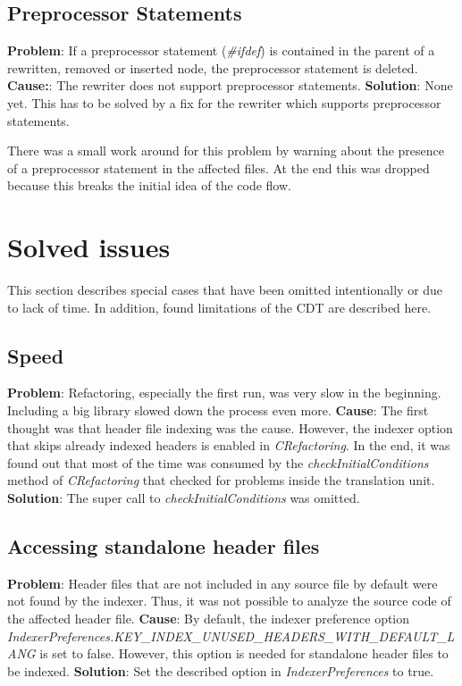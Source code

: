 \subsection{Preprocessor Statements}
\textbf{Problem}: If a preprocessor statement (\textit{\#ifdef}) is contained in
the parent of a rewritten, removed or inserted node, the preprocessor statement
is deleted.
\textbf{Cause:}: The rewriter does not support preprocessor statements.
\textbf{Solution}: None yet. This has to be solved by a fix for the rewriter
which supports preprocessor statements.

There was a small work around for this problem by warning about the presence of
a preprocessor statement in the affected files. At the end this was dropped
because this breaks the initial idea of the code flow.

\section{Solved issues}

This section describes special cases that have been omitted intentionally or due 
to lack of time. In addition, found limitations of the CDT are described here.

\subsection{Speed}
\textbf{Problem}: Refactoring, especially the first run, was very slow in the 
beginning. Including a big library slowed down the process even more.
\textbf{Cause}: The first thought was that header file indexing was the cause. 
However, the indexer option that skips already indexed headers is enabled in 
\textit{CRefactoring}. In the end, it was found out that most of the time was 
consumed by the \textit{checkInitialConditions} method of \textit{CRefactoring} 
that checked for problems inside the translation unit.
\textbf{Solution}: The super call to \textit{checkInitialConditions} was omitted.

\subsection{Accessing standalone header files}
\textbf{Problem}: Header files that are not included in any source file by 
default were not found by the indexer. Thus, it was not possible to analyze the 
source code of the affected header file.
\textbf{Cause}: By default, the indexer preference option 
\textit{IndexerPreferences.KEY\_INDEX\_UNUSED\_HEADERS\_WITH\_DEFAULT\_LANG} is 
set to false. However, this option is needed for standalone header files to be 
indexed.
\textbf{Solution}: Set the described option in \textit{IndexerPreferences} to 
true.

